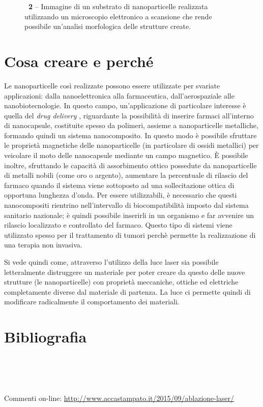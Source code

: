 \begin{figure}[!b]
\begin{center}
\caption{\textbf{\figurename~2} -- Immagine di un substrato di nanoparticelle realizzata utilizzando un microscopio elettronico a scansione che rende possibile un'analisi morfologica delle strutture create.
}
\label{fig:sem}
\end{center}
\vskip-20pt
\end{figure}

\section*{Cosa creare e perché}
Le nanoparticelle così realizzate possono essere utilizzate per svariate applicazioni: dalla nanoelettronica alla farmaceutica, dall'aerospaziale alle nanobiotecnologie. In questo campo, un'applicazione di particolare interesse è quella del \emph{drug delivery} \cite{Mora}, riguardante la possibilità di inserire farmaci all'interno di nanocapsule, costituite spesso da polimeri, assieme a nanoparticelle metalliche, formando quindi un sistema nanocomposito. In questo modo è possibile sfruttare le proprietà magnetiche delle nanoparticelle (in particolare di ossidi metallici) per veicolare il moto delle nanocapsule mediante un campo magnetico. È possibile inoltre, sfruttando le capacità di assorbimento ottico possedute da nanoparticelle di metalli nobili (come oro o argento), aumentare la percentuale di rilascio del farmaco quando il sistema viene sottoposto ad una sollecitazione ottica di opportuna lunghezza d'onda. Per essere utilizzabili, è necessario che questi nanocompositi rientrino nell'intervallo di biocompatibilità imposto dal sistema sanitario nazionale; è quindi possibile inserirli in un organismo e far avvenire un rilascio localizzato e controllato del farmaco. Questo tipo di sistemi viene utilizzato spesso per il trattamento di tumori perchè permette la realizzazione di una terapia non invasiva.

Si vede quindi come, attraverso l'utilizzo della luce laser sia possibile letteralmente distruggere un materiale per poter creare da questo delle nuove strutture (le nanoparticelle) con proprietà meccaniche, ottiche ed elettriche completamente diverse dal materiale di partenza. La luce ci permette quindi di modificare radicalmente il comportamento dei materiali.

\section*{Bibliografia}
\\
\\
\\

\smallskip
Commenti on-line: \url{http://www.accastampato.it/2015/09/ablazione-laser/}
